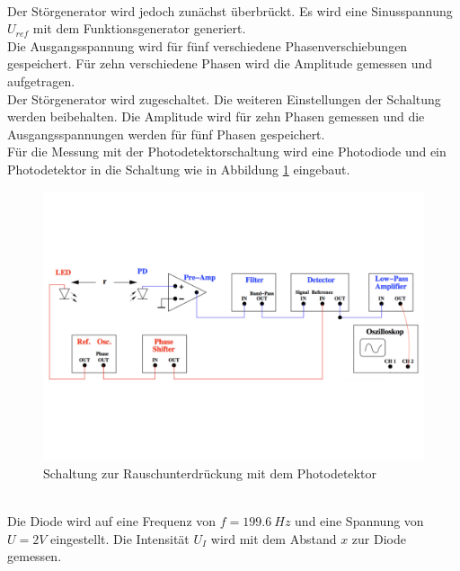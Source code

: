 \\Der Störgenerator wird jedoch zunächst überbrückt.
Es wird eine Sinusspannung $U_{ref}$ mit dem Funktionsgenerator generiert.
\\Die Ausgangsspannung wird für fünf verschiedene Phasenverschiebungen gespeichert.
Für zehn verschiedene Phasen wird die Amplitude gemessen und aufgetragen.
\\Der Störgenerator wird zugeschaltet.
Die weiteren Einstellungen der Schaltung werden beibehalten.
Die Amplitude wird für zehn Phasen gemessen und die Ausgangsspannungen werden für fünf Phasen gespeichert.
\\Für die Messung mit der Photodetektorschaltung wird eine Photodiode und ein Photodetektor in die Schaltung wie in Abbildung \ref{fig:Photo} eingebaut.
\begin{figure}[h!]
  \centering
  \includegraphics[width=\textwidth]{Photodetektor.pdf}
  \caption{Schaltung zur Rauschunterdrückung mit dem Photodetektor \cite{1}}
  \label{fig:Photo}
\end{figure}
\\Die Diode wird auf eine Frequenz von $f=\SI{199,6}{Hz}$ und eine Spannung von $U=2V$ eingestellt.
Die Intensität $U_{I}$ wird mit dem Abstand $x$ zur Diode gemessen.



\FloatBarrier
